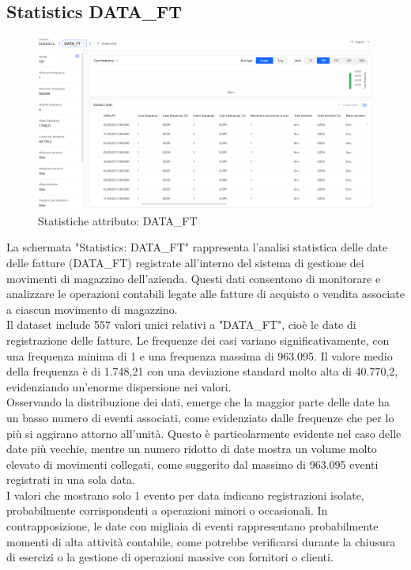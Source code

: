 \documentclass{article}
\begin{document}
\subsection{Statistics DATA\_FT}
\begin{figure}[H]
    \centering
    \includegraphics[width=\textwidth]{imgMicrosoft/DatiReali/StatisticsDATAFTDatiReali.png}
    \caption{Statistiche attributo: DATA\_FT}
    \label{fig:statistics-DATA-FT}
\end{figure}
La schermata "Statistics: DATA\_FT" rappresenta l'analisi statistica delle date delle fatture (DATA\_FT) registrate all'interno del sistema di gestione dei movimenti di magazzino dell'azienda. Questi dati consentono di monitorare e analizzare le operazioni contabili legate alle fatture di acquisto o vendita associate a ciascun movimento di magazzino.\\
Il dataset include 557 valori unici relativi a "DATA\_FT", cioè le date di registrazione delle fatture. Le frequenze dei casi variano significativamente, con una frequenza minima di 1 e una frequenza massima di 963.095. Il valore medio della frequenza è di 1.748,21 con una deviazione standard molto alta di 40.770,2, evidenziando un'enorme dispersione nei valori.\\
Osservando la distribuzione dei dati, emerge che la maggior parte delle date ha un basso numero di eventi associati, come evidenziato dalle frequenze che per lo più si aggirano attorno all'unità. Questo è particolarmente evidente nel caso delle date più vecchie, mentre un numero ridotto di date mostra un volume molto elevato di movimenti collegati, come suggerito dal massimo di 963.095 eventi registrati in una sola data.\\
I valori che mostrano solo 1 evento per data indicano registrazioni isolate, probabilmente corrispondenti a operazioni minori o occasionali. In contrapposizione, le date con migliaia di eventi rappresentano probabilmente momenti di alta attività contabile, come potrebbe verificarsi durante la chiusura di esercizi o la gestione di operazioni massive con fornitori o clienti.\\
\end{document}

